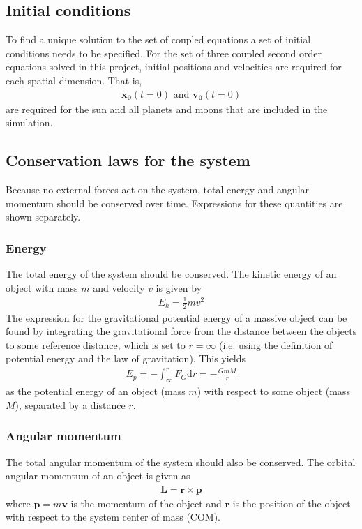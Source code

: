 \documentclass[aps,reprint]{revtex4-1}
\begin{document}
\subsection{Initial conditions}
To find a unique solution to the set of coupled equations a set of initial conditions needs
to be specified. For the set of three coupled second order equations solved in this project,
initial positions and velocities are required for each spatial dimension. That is,
\begin{align*}
 \mathbf{x_0}(t = 0) \text{ and } \mathbf{v_0}(t = 0)
\end{align*}
are required for the sun and all planets and moons that are included in the simulation.

\subsection{Conservation laws for the system}
Because no external forces act on the system, total energy and angular momentum should
be conserved over time. Expressions for these quantities are shown separately.
\subsubsection{Energy}
The total energy of the system should be conserved. The kinetic energy of an object with
mass $m$ and velocity $v$ is given by
\begin{align*}
 E_k = \frac{1}{2}m v^2
\end{align*}
The expression for the gravitational potential energy of a massive object can be found by
integrating the gravitational force from the distance between the objects to some reference
distance, which is set to $r = \infty$ (i.e. using the definition of potential energy and the law
of gravitation). This yields
\begin{align*}
  \label{eq:potentialenergy}
 E_p = -\int_\infty^r F_G \text{d} r = -\frac{GmM}{r}
\end{align*}
as the potential energy of an object (mass $m$) with respect to some object (mass $M$),
separated by a distance $r$.
\subsubsection{Angular momentum}
The total angular momentum of the system should also be conserved. The orbital
angular momentum of an object is given as
\begin{align}
  \mathbf{L} = \mathbf{r} \times \mathbf{p}
\end{align}
where $\mathbf{p} = m \mathbf{v}$ is the momentum of the object and $\mathbf{r}$
is the position of the object with respect to the system center of mass (COM).
\end{document}
